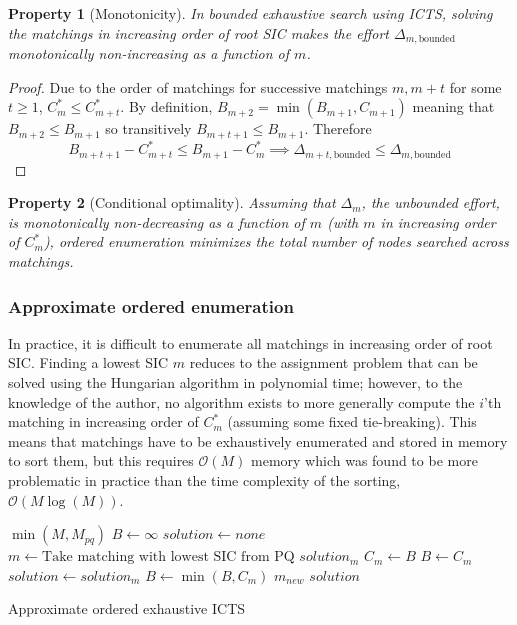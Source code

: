 \documentclass[english]{article}
\newtheorem{property}{Property}
\begin{document}
	\begin{property}[Monotonicity]
		\label{monotonicity}
		In bounded exhaustive search using ICTS, solving the matchings in increasing order of root SIC makes the effort $\Delta_{m,\text{bounded}}$ monotonically non-increasing as a function of $m$.
	\end{property}
	\begin{proof}
		Due to the order of matchings for successive matchings $m,m+t$ for some $t\geq 1$, $C^*_{m} \leq C^*_{m+t}$. By definition, $B_{m+2} = \min(B_{m+1},C_{m+1})$ meaning that $B_{m+2} \leq B_{m + 1}$ so transitively $B_{m+t+1} \leq B_{m+1}$. Therefore
		\[B_{m+t+1} - C^*_{m+t}\leq B_{m+1} - C^*_m\implies \Delta_{m+t,\text{bounded}} \leq \Delta_{m,\text{bounded}}\]
	\end{proof}
	\begin{property}[Conditional optimality]
		\label{cond-monoton-optim}
		Assuming that $\Delta_m$, the unbounded effort, is monotonically non-decreasing as a function of $m$ (with $m$ in increasing order of $C^*_m$), ordered enumeration minimizes the total number of nodes searched across matchings.
	\end{property}
	\subsubsection{Approximate ordered enumeration}
	In practice, it is difficult to enumerate all matchings in increasing order of root SIC. Finding a lowest SIC $m$ reduces to the assignment problem that can be solved using the Hungarian algorithm \cite{kuhn55} in polynomial time; however, to the knowledge of the author, no algorithm exists to more generally compute the $i$'th matching in increasing order of $C^*_m$ (assuming some fixed tie-breaking). This means that matchings have to be exhaustively enumerated and stored in memory to sort them, but this requires $\mathcal{O}(M)$ memory which was found to be more problematic in practice than the time complexity of the sorting, $\mathcal{O}(M\log(M))$.
	
	\begin{algorithm}
		\begin{algorithmic}[1]
			\State {}$\min(M,M_{pq})$
			\State $B \gets \infty$
			\State $solution \gets none$
			\Repeat
			\State $m\gets\text{Take matching with lowest SIC from PQ}$
			\State $solution_m$  $C_m\gets$$B$ 
			\State $B\gets C_m$
			\State $solution \gets solution_m$
			\EndIf
			\State $B\gets\min(B,C_m)$
			\State {}$m_{new}$
			\EndIf
			\Return $solution$
		\end{algorithmic}
		\caption{Approximate ordered exhaustive ICTS} 
		\label{pq-algo}
	\end{algorithm}
	
\end{document}
